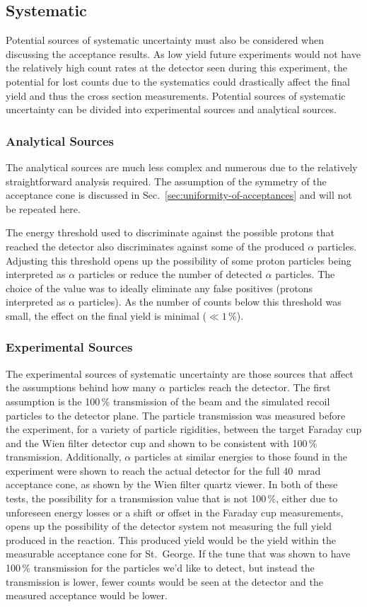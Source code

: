 \subsection{Systematic}

Potential sources of systematic uncertainty must also be considered when
discussing the acceptance results. As low yield future experiments would
not have the relatively high count rates at the detector seen during
this experiment, the potential for lost counts due to the systematics
could drastically affect the final yield and thus the cross section
measurements. Potential sources of systematic uncertainty can be divided
into experimental sources and analytical sources.

\subsubsection{Analytical Sources}
The analytical sources are much less complex and numerous due to the
relatively straightforward analysis required. The assumption of the
symmetry of the acceptance cone is discussed in
Sec.~\ref{sec:uniformity-of-acceptances} and will not be repeated here.

The energy threshold used to discriminate against the possible protons
that reached the detector also discriminates against some of the
produced $\alpha$ particles. Adjusting this threshold opens up the
possibility of some proton particles being interpreted as $\alpha$
particles or reduce the number of detected $\alpha$ particles. The
choice of the value was to ideally eliminate any false positives
(protons interpreted as $\alpha$ particles). As the number of counts
below this threshold was small, the effect on the final yield is
minimal ($\ll 1$\,\%).

\subsubsection{Experimental Sources}
The experimental sources of systematic uncertainty are those sources
that affect the assumptions behind how many $\alpha$ particles reach the
detector. The first assumption is the 100\,\% transmission of the beam
and the simulated recoil particles to the detector plane. The particle
transmission was measured before the experiment, for a variety of
particle rigidities, between the target Faraday cup and the Wien filter
detector cup and shown to be consistent with 100\,\% transmission.
Additionally, $\alpha$ particles at similar energies to those found in
the experiment were shown to reach the actual detector for the full
40~mrad acceptance cone, as shown by the Wien filter quartz viewer. In
both of these tests, the possibility for a transmission value that is
not 100\,\%, either due to unforeseen energy losses or a shift or offset
in the Faraday cup measurements, opens up the possibility of the
detector system not measuring the full yield produced in the reaction.
This produced yield would be the yield within the measurable acceptance
cone for St.\ George. If the tune that was shown to have 100\,\%
transmission for the particles we'd like to detect, but instead the
transmission is lower, fewer counts would be seen at the detector and
the measured acceptance would be lower.


